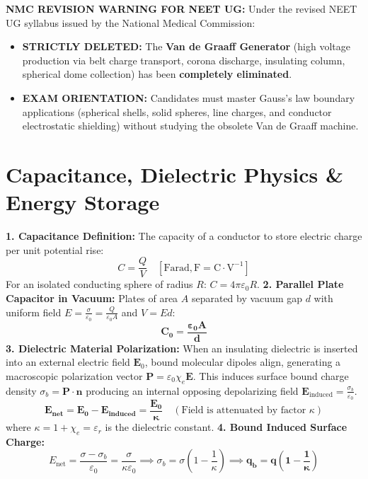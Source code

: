 \documentclass[10pt,a4paper]{article}
\begin{document}
\begin{trapbox}
\textbf{NMC REVISION WARNING FOR NEET UG:}
Under the revised NEET UG syllabus issued by the National Medical Commission:
\begin{itemize}
  \item \textbf{STRICTLY DELETED:} The \textbf{Van de Graaff Generator} (high voltage production via belt charge transport, corona discharge, insulating column, spherical dome collection) has been \textbf{completely eliminated}.
  \item \textbf{EXAM ORIENTATION:} Candidates must master Gauss's law boundary applications (spherical shells, solid spheres, line charges, and conductor electrostatic shielding) without studying the obsolete Van de Graaff machine.
\end{itemize}
\end{trapbox}

\section{Capacitance, Dielectric Physics \& Energy Storage}

\begin{conceptbox}
\textbf{1. Capacitance Definition:}
The capacity of a conductor to store electric charge per unit potential rise:
\begin{equation}
  C = \frac{Q}{V} \quad [\mathrm{Farad}, \mathrm{F} = \mathrm{C}\cdot\mathrm{V}^{-1}]
\end{equation}
For an isolated conducting sphere of radius $R$: $C = 4\pi\varepsilon_0 R$.
\textbf{2. Parallel Plate Capacitor in Vacuum:}
Plates of area $A$ separated by vacuum gap $d$ with uniform field $E = \frac{\sigma}{\varepsilon_0} = \frac{Q}{\varepsilon_0 A}$ and $V = Ed$:
\begin{equation}
  \mathbf{C_0 = \frac{\varepsilon_0 A}{d}}
\end{equation}
\textbf{3. Dielectric Material Polarization:}
When an insulating dielectric is inserted into an external electric field $\mathbf{E}_0$, bound molecular dipoles align, generating a macroscopic polarization vector $\mathbf{P} = \varepsilon_0 \chi_e \mathbf{E}$.
This induces surface bound charge density $\sigma_b = \mathbf{P}\cdot\hat{\mathbf{n}}$ producing an internal opposing depolarizing field $\mathbf{E}_{\text{induced}} = \frac{\sigma_b}{\varepsilon_0}$.
\begin{equation}
  \mathbf{E_{\text{net}} = \mathbf{E}_0 - \mathbf{E}_{\text{induced}} = \frac{\mathbf{E}_0}{\kappa}} \quad (\text{Field is attenuated by factor } \kappa)
\end{equation}
where $\kappa = 1 + \chi_e = \varepsilon_r$ is the dielectric constant.
\textbf{4. Bound Induced Surface Charge:}
\begin{equation}
  E_{\text{net}} = \frac{\sigma - \sigma_b}{\varepsilon_0} = \frac{\sigma}{\kappa\varepsilon_0} \implies \sigma_b = \sigma\left(1 - \frac{1}{\kappa}\right) \implies \mathbf{q_b = q\left(1 - \frac{1}{\kappa}\right)}
\end{equation}
\end{conceptbox}
\end{document}
